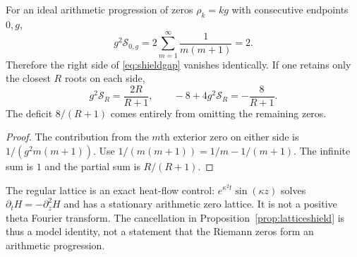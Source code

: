 \begin{proposition}
\label{prop:latticeshield}
For an ideal arithmetic progression of zeros
$\rho_k=kg$ with consecutive endpoints $0,g$,
\[
\boxed{
g^2\mathcal S_{0,g}
=2\sum_{m=1}^\infty\frac1{m(m+1)}=2.}
\]
Therefore the right side of \eqref{eq:shieldgap}
vanishes identically. If one retains only
the closest $R$ roots on each side,
\begin{equation}
g^2\mathcal S_R=\frac{2R}{R+1},
\qquad
-8+4g^2\mathcal S_R=-\frac8{R+1}.
\label{eq:truncatedshield}
\end{equation}
The deficit $8/(R+1)$ comes entirely from
omitting the remaining zeros.
\end{proposition}
\begin{proof}
The contribution from the $m$th exterior
zero on either side is
$1/(g^2m(m+1))$.
Use $1/(m(m+1))=1/m-1/(m+1)$.
The infinite sum is $1$ and
the partial sum is $R/(R+1)$.
\end{proof}

The regular lattice is an exact heat-flow control:
$e^{\kappa^2t}\sin(\kappa z)$ solves
$\partial_tH=-\partial_z^2H$
and has a stationary arithmetic zero lattice.
It is not a positive theta Fourier transform.
The cancellation in Proposition~\ref{prop:latticeshield}
is thus a model identity, not a statement that
the Riemann zeros form an arithmetic progression.

